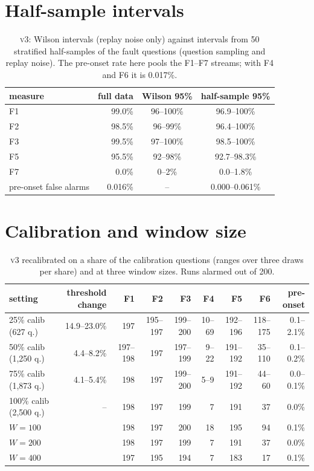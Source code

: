 \documentclass{article}
\newcommand{\vthree}{\textsc{v3}}
\begin{document}
\section{Half-sample intervals}
\label{app:half}
\begin{table}[h]
  \centering\small
  \caption{\vthree{}: Wilson intervals (replay noise only) against intervals from 50
  stratified half-samples of the fault questions (question sampling and replay
  noise). The pre-onset rate here pools the F1--F7 streams; with F4 and F6 it is
  0.017\%.}
  \begin{tabular}{lrcc}
    \toprule
    measure & full data & Wilson 95\% & half-sample 95\% \\
    \midrule
    F1 & 99.0\% & 96--100\% & 96.9--100\% \\
    F2 & 98.5\% & 96--99\% & 96.4--100\% \\
    F3 & 99.5\% & 97--100\% & 98.5--100\% \\
    F5 & 95.5\% & 92--98\% & 92.7--98.3\% \\
    F7 & 0.0\% & 0--2\% & 0.0--1.8\% \\
    pre-onset false alarms & 0.016\% & -- & 0.000--0.061\% \\
    \bottomrule
  \end{tabular}
\end{table}

\section{Calibration and window size}
\label{app:sens}
\begin{table}[h]
  \centering\small
  \caption{\vthree{} recalibrated on a share of the calibration questions (ranges over
  three draws per share) and at three window sizes. Runs alarmed
  out of 200.}
  \setlength{\tabcolsep}{4pt}
  \begin{tabular}{lrrrrrrrr}
    \toprule
    setting & threshold change & F1 & F2 & F3 & F4 & F5 & F6 & pre-onset \\
    \midrule
    25\% calib (627 q.) & 14.9--23.0\% & 197 & 195--197 & 199--200 & 10--69 & 192--196 & 118--175 & 0.1--2.1\% \\
    50\% calib (1{,}250 q.) & 4.4--8.2\% & 197--198 & 197 & 197--199 & 9--22 & 191--192 & 35--110 & 0.1--0.2\% \\
    75\% calib (1{,}873 q.) & 4.1--5.4\% & 198 & 197 & 199--200 & 5--9 & 191--192 & 44--60 & 0.0--0.1\% \\
    100\% calib (2{,}500 q.) & -- & 198 & 197 & 199 & 7 & 191 & 37 & 0.0\% \\
    \midrule
    $W=100$ & & 198 & 197 & 200 & 18 & 195 & 94 & 0.1\% \\
    $W=200$ & & 198 & 197 & 199 & 7 & 191 & 37 & 0.0\% \\
    $W=400$ & & 197 & 195 & 194 & 7 & 183 & 17 & 0.1\% \\
    \bottomrule
  \end{tabular}
\end{table}
\end{document}
